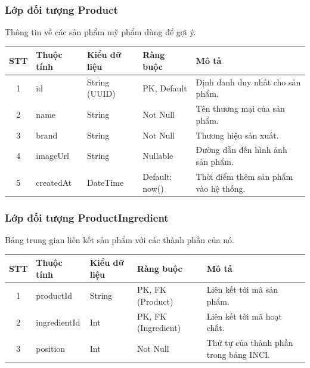 \documentclass[12pt,a4paper]{article}
\begin{document}
\subsubsection{Lớp đối tượng Product}
Thông tin về các sản phẩm mỹ phẩm dùng để gợi ý.

\begin{center}
\renewcommand{\arraystretch}{1.4}
\begin{tabularx}{\textwidth}{|c|l|l|l|X|}
\hline
\rowcolor{blue!15}
\textbf{STT} & \textbf{Thuộc tính} & \textbf{Kiểu dữ liệu} & \textbf{Ràng buộc} & \textbf{Mô tả} \\ \hline
1 & id & String (UUID) & PK, Default & Định danh duy nhất cho sản phẩm. \\ \hline
2 & name & String & Not Null & Tên thương mại của sản phẩm. \\ \hline
3 & brand & String & Not Null & Thương hiệu sản xuất. \\ \hline
4 & imageUrl & String & Nullable & Đường dẫn đến hình ảnh sản phẩm. \\ \hline
5 & createdAt & DateTime & Default: now() & Thời điểm thêm sản phẩm vào hệ thống. \\ \hline
\end{tabularx}
\end{center}

\subsubsection{Lớp đối tượng ProductIngredient}
Bảng trung gian liên kết sản phẩm với các thành phần của nó.

\begin{center}
\renewcommand{\arraystretch}{1.4}
\begin{tabularx}{\textwidth}{|c|l|l|l|X|}
\hline
\rowcolor{blue!15}
\textbf{STT} & \textbf{Thuộc tính} & \textbf{Kiểu dữ liệu} & \textbf{Ràng buộc} & \textbf{Mô tả} \\ \hline
1 & productId & String & PK, FK (Product) & Liên kết tới mã sản phẩm. \\ \hline
2 & ingredientId & Int & PK, FK (Ingredient) & Liên kết tới mã hoạt chất. \\ \hline
3 & position & Int & Not Null & Thứ tự của thành phần trong bảng INCI. \\ \hline
\end{tabularx}
\end{center}

\end{document}
